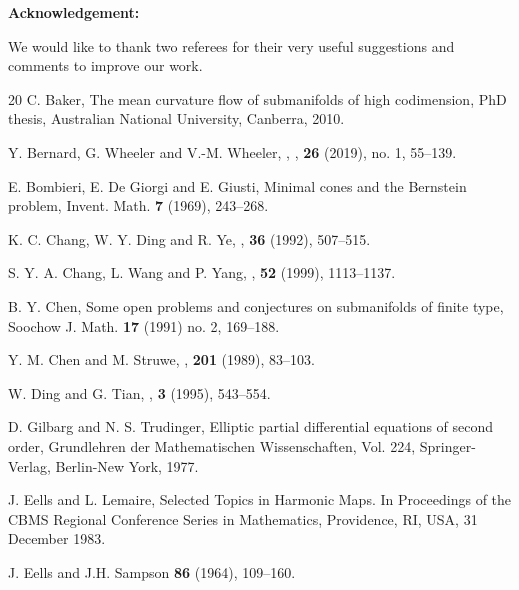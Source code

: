 \documentclass{amsart}
\theoremstyle{definition}
\numberwithin{equation}{section}
\begin{document}
\medskip\noindent
{\bf Acknowledgement:} {We would like to thank two referees for their very useful suggestions and comments to improve our work.


 \begin{thebibliography}{20}
 C. Baker, The mean curvature flow of submanifolds of high codimension, PhD thesis, Australian National University, Canberra, 2010.

    Y. Bernard,   G. Wheeler and V.-M. Wheeler,
    ,
    , {\bf 26} (2019),  no. 1, 55--139.


E. Bombieri, E. De Giorgi and E. Giusti, Minimal cones and the Bernstein problem, Invent. Math. {\bf 7} (1969), 243--268.


    K. C. Chang, W. Y. Ding and R. Ye,
    ,
     {\bf 36} (1992),   507--515.

  S. Y. A.  Chang, L. Wang   and P. Yang,
    ,
     {\bf 52}  (1999), 1113--1137.


  B. Y. Chen, Some open problems and conjectures on submanifolds of finite
type, Soochow J. Math. {\bf17} (1991) no. 2, 169--188.



        Y. M. Chen and  M. Struwe,
        ,
         {\bf 201} (1989), 83--103.


    W. Ding and G. Tian,
    ,
     {\bf 3} (1995), 543--554.



 D. Gilbarg and  N. S.  Trudinger,
  {Elliptic partial differential equations of second order},  Grundlehren der Mathematischen Wissenschaften, Vol. 224, Springer-Verlag,
  Berlin-New York, 1977.


J. Eells and L. Lemaire, Selected Topics in Harmonic Maps. In
Proceedings of the CBMS Regional Conference Series in Mathematics,
Providence, RI, USA, 31 December 1983.

        J. Eells and J.H. Sampson
         {\bf 86} (1964), 109--160.




\end{thebibliography}}
\end{document}
